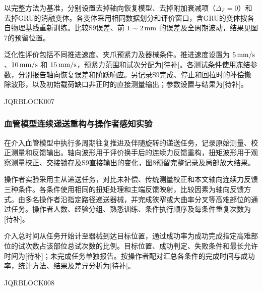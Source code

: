 以完整方法为基准，分别设置去掉轴向恢复模型、去掉附加衰减项（$\Delta_F=0$）和去掉GRU的消融变体。各变体采用相同数据划分和评价窗口，含GRU的变体按各自物理基线重新训练。比较S9误差、前 $1\sim2\,{\rm mm}$ 的误差及全周期波动，结果见图7的预留位置。





泛化性评价包括不同推进速度、夹爪预紧力及器械条件。推进速度设置为 $5\,{\rm mm/s}$、$10\,{\rm mm/s}$ 和 $15\,{\rm mm/s}$，预紧力范围和试次分配为[待补]。各测试条件使用冻结参数，分别报告轴向恢复误差和阶跃响应。另记录S9完成、停止和回拉时的补偿撤除波形，以及初始载荷缺口非正时的直接测量输出；参数设置与结果为[待补]。







JQRBLOCK007







\subsubsection{血管模型连续递送重构与操作者感知实验}





在介入血管模型中执行多周期往复推进及伴随旋转的递送任务，记录原始测量、校正测量和反馈输出。轴向波形用于评价换手后的连续力反馈重构，扭矩波形用于观察测量校正、交接锁存及S9直接输出的变化，图8预留完整记录及局部放大结果。





操作者实验采用主从递送任务，对比未补偿、传统测量校正和本文轴向连续力反馈三种条件。各条件使用相同的扭矩处理和主端反馈映射，比较因素为轴向反馈方式。由多名操作者沿指定路径递送器械，并完成狭窄或大曲率分叉等高难部位的通过任务。操作者人数、经验分组、熟悉训练、条件执行顺序及每条件重复次数为[待补]。





介入总时间从任务开始计至器械到达目标位置，通过成功率为成功完成指定高难部位的试次数占该部位总试次数的比例。目标位置、成功判定、失败条件和最长允许时间为[待补]；未完成任务单独报告。按操作者配对汇总各条件的完成时间与成功率，统计方法、结果及差异分析为[待补]。







JQRBLOCK008






